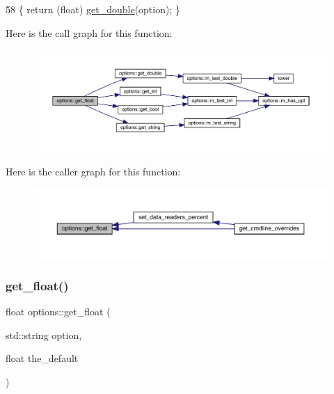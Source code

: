 \begin{DoxyCode}
58 \{ \textcolor{keywordflow}{return} (\textcolor{keywordtype}{float}) \hyperlink{classoptions_a0e8ff0d44b9192754451f9dcd47cd559}{get\_double}(option); \}
\end{DoxyCode}
Here is the call graph for this function\+:\nopagebreak
\begin{figure}[H]
\begin{center}
\leavevmode
\includegraphics[width=350pt]{classoptions_a31607533d0c6d2fa331f4e7f52d34bc8_cgraph}
\end{center}
\end{figure}
Here is the caller graph for this function\+:\nopagebreak
\begin{figure}[H]
\begin{center}
\leavevmode
\includegraphics[width=350pt]{classoptions_a31607533d0c6d2fa331f4e7f52d34bc8_icgraph}
\end{center}
\end{figure}
\mbox{\label{classoptions_a113445829763eaa7b86cdc40c2d66e25}} 
\subsubsection{\texorpdfstring{get\+\_\+float()}{get\_float()}\hspace{0.1cm}{\footnotesize\ttfamily [2/2]}}
{\footnotesize\ttfamily float options\+::get\+\_\+float (\begin{DoxyParamCaption}\item[{std\+::string}]{option,  }\item[{float}]{the\+\_\+default }\end{DoxyParamCaption})\hspace{0.3cm}{\ttfamily [inline]}}



